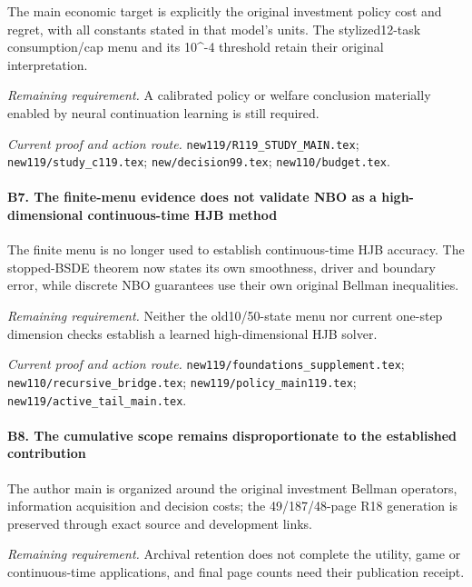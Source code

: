 The main economic target is explicitly the original investment policy cost and regret, with all constants stated in that model's units. The stylized12-task consumption/\allowbreak{}cap menu and its 10\textasciicircum{}-4 threshold retain their original interpretation.

\par\emph{Remaining requirement.} A calibrated policy or welfare conclusion materially enabled by neural continuation learning is still required.

\par\emph{Current proof and action route.} \nolinkurl{new119/R119_STUDY_MAIN.tex}; \nolinkurl{new119/study_c119.tex}; \nolinkurl{new/decision99.tex}; \nolinkurl{new110/budget.tex}.

\paragraph{B7. The finite-menu evidence does not validate NBO as a high-dimensional continuous-time HJB method}

The finite menu is no longer used to establish continuous-time HJB accuracy. The stopped-BSDE theorem now states its own smoothness, driver and boundary error, while discrete NBO guarantees use their own original Bellman inequalities.

\par\emph{Remaining requirement.} Neither the old10/50-state menu nor current one-step dimension checks establish a learned high-dimensional HJB solver.

\par\emph{Current proof and action route.} \nolinkurl{new119/foundations_supplement.tex}; \nolinkurl{new110/recursive_bridge.tex}; \nolinkurl{new119/policy_main119.tex}; \nolinkurl{new119/active_tail_main.tex}.

\paragraph{B8. The cumulative scope remains disproportionate to the established contribution}

The author main is organized around the original investment Bellman operators, information acquisition and decision costs; the 49/187/48-page R18 generation is preserved through exact source and development links.

\par\emph{Remaining requirement.} Archival retention does not complete the utility, game or continuous-time applications, and final page counts need their publication receipt.

